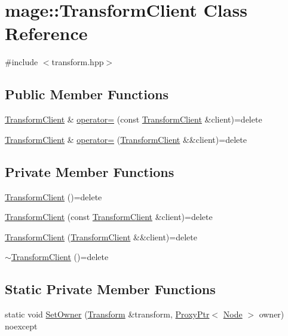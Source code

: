 \hypertarget{classmage_1_1_transform_client}{}\section{mage\+:\+:Transform\+Client Class Reference}
\label{classmage_1_1_transform_client}


{\ttfamily \#include $<$transform.\+hpp$>$}

\subsection*{Public Member Functions}
\begin{DoxyCompactItemize}
\item 
\hyperlink{classmage_1_1_transform_client}{Transform\+Client} \& \hyperlink{classmage_1_1_transform_client_a6b2ff0d0e14dbd42a26159547fd1e6b4}{operator=} (const \hyperlink{classmage_1_1_transform_client}{Transform\+Client} \&client)=delete
\item 
\hyperlink{classmage_1_1_transform_client}{Transform\+Client} \& \hyperlink{classmage_1_1_transform_client_aace10c91a28d9441776334431a6106d7}{operator=} (\hyperlink{classmage_1_1_transform_client}{Transform\+Client} \&\&client)=delete
\end{DoxyCompactItemize}
\subsection*{Private Member Functions}
\begin{DoxyCompactItemize}
\item 
\hyperlink{classmage_1_1_transform_client_af42a36c32cded66b699ac69a526e8105}{Transform\+Client} ()=delete
\item 
\hyperlink{classmage_1_1_transform_client_a7b9aa8dbbb39294daceae6cc5da9c9f5}{Transform\+Client} (const \hyperlink{classmage_1_1_transform_client}{Transform\+Client} \&client)=delete
\item 
\hyperlink{classmage_1_1_transform_client_aa6f9f3b26701748b3c7aa5b194ea6d5e}{Transform\+Client} (\hyperlink{classmage_1_1_transform_client}{Transform\+Client} \&\&client)=delete
\item 
\hyperlink{classmage_1_1_transform_client_acc5960c1dd23ec86574a99b68023dde3}{$\sim$\+Transform\+Client} ()=delete
\end{DoxyCompactItemize}
\subsection*{Static Private Member Functions}
\begin{DoxyCompactItemize}
\item 
static void \hyperlink{classmage_1_1_transform_client_a2aa5a5d9d95b161f6673409cc11e1e1c}{Set\+Owner} (\hyperlink{classmage_1_1_transform}{Transform} \&transform, \hyperlink{classmage_1_1_proxy_ptr}{Proxy\+Ptr}$<$ \hyperlink{classmage_1_1_node}{Node} $>$ owner) noexcept
\end{DoxyCompactItemize}
